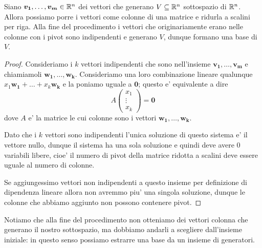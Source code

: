 \begin{proposition}\label{estrarre_una_base}
    Siano $\bm{v_1}, \dots, \bm{v_m} \in \mathbb{R}^n$ dei vettori che generano $V \subseteq \mathbb{R}^n$ sottospazio di $\mathbb{R}^n$. Allora possiamo porre i vettori come colonne di una matrice e ridurla a scalini per riga. Alla fine del procedimento i vettori che originariamente erano nelle colonne con i pivot sono indipendenti e generano $V$, dunque formano una base di $V$.
\end{proposition}
\begin{proof}
    Consideriamo i $k$ vettori indipendenti che sono nell'insieme $\bm{v_1}, \dots, \bm{v_m}$ e chiamiamoli $\bm{w_1}, \dots, \bm{w_k}$.
    Consideriamo una loro combinazione lineare qualunque $x_1\bm{w_1} + \dots + x_k\bm{w_k}$ e la poniamo uguale a $\bm{0}$; questo e' equivalente a dire \[
        A\begin{pmatrix}
            x_1 \\ \vdots \\ x_k
        \end{pmatrix} = \bm{0}
    \] dove $A$ e' la matrice le cui colonne sono i vettori $\bm{w_1}, \dots, \bm{w_k}$. 
    
    Dato che i $k$ vettori sono indipendenti l'unica soluzione di questo sistema e' il vettore nullo, dunque il sistema ha una sola soluzione e quindi deve avere $0$ variabili libere, cioe' il numero di pivot della matrice ridotta a scalini deve essere uguale al numero di colonne.

    Se aggiungessimo vettori non indipendenti a questo insieme per definizione di dipendenza lineare allora non avremmo piu' una singola soluzione, dunque le colonne che abbiamo aggiunto non possono contenere pivot.
\end{proof}

Notiamo che alla fine del procedimento non otteniamo dei vettori colonna che generano il nostro sottospazio, ma dobbiamo andarli a scegliere dall'insieme iniziale: in questo senso possiamo estrarre una base da un insieme di generatori.


